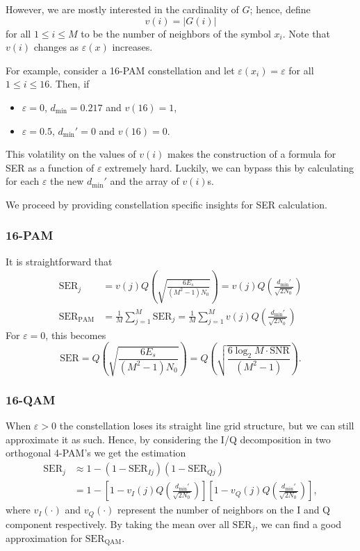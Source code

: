 \documentclass[11pt,a4paper,onecolumn,final]{article}
\newcommand{\dmin}{d_\text{min}}
\newcommand{\eps}{\varepsilon}
\begin{document}
However, we are mostly interested in the cardinality of \(G\); hence, define 
\begin{equation}
    v(i) = |G(i)| 
\end{equation}
for all \(1 \leq i \leq M\) to be the number of neighbors of the symbol \(x_i\). 
Note that \(v(i)\) changes as \(\eps(x)\) increases. 

For example, consider a 16-PAM constellation and let \(\eps(x_i) = \eps\) for all \(1 \leq i \leq 16\). Then, if 
\begin{itemize}
    \item \(\eps = 0\), \(\dmin = 0.217\) and \(v(16) = 1\), 
    \item \(\eps = 0.5\), \(\dmin ' = 0\) and \(v(16) = 0\). 
\end{itemize}
This volatility on the values of \(v(i)\) makes the construction of a formula for SER as a function of \(\eps\) extremely hard. Luckily, we can bypass this by calculating for each \(\eps\) the new \(\dmin '\) and the array of \(v(i)\)s. 

We proceed by providing constellation specific insights for SER calculation. 

\subsubsection*{16-PAM}
It is straightforward that
\begin{align}
    \text{SER}_j &= v(j)Q\left(\sqrt{\frac{6E_s }{(M^2 - 1) N_0}}\right) = v(j)Q\left(\frac{\dmin ' }{\sqrt{2N_0}}\right) \\
    \text{SER}_\text{PAM} &= \frac{1}{M }\sum_{j = 1}^{M } \text{SER}_j = \frac{1}{M }\sum_{j = 1}^{M }v(j)Q\left(\frac{\dmin ' }{\sqrt{2N_0}}\right)
\end{align}
For \(\eps = 0\), this becomes 
\begin{equation}
    \text{SER} = Q\left(\sqrt{\frac{6E_s }{(M^2 - 1) N_0}}\right) = Q\left(\sqrt{\frac{6\log_2 M \cdot\text{SNR}}{(M^2 - 1)}}\right).
\end{equation}

\subsubsection*{16-QAM}
When \(\eps > 0\) the constellation loses its straight line grid structure, but we can still approximate it as such. Hence, by considering the I/Q decomposition in two orthogonal 4-PAM's we get the estimation
\begin{align}
    \text{SER}_j &\approx 1 - (1 - \text{SER}_{Ij})(1 - \text{SER}_{Qj}) \\
        &=  1 - \left[1 - v_I(j)Q\left(\frac{\dmin ' }{\sqrt{2N_0}}\right)\right]\left[1 - v_Q(j)Q\left(\frac{\dmin ' }{\sqrt{2N_0}}\right)\right],
\end{align}
where \(v_I(\cdot)\) and \(v_Q(\cdot)\) represent the number of neighbors on the I and Q component respectively. By taking the mean over all \(\text{SER}_j\), we can find a good approximation for \(\text{SER}_\text{QAM}\). 
\end{document}
